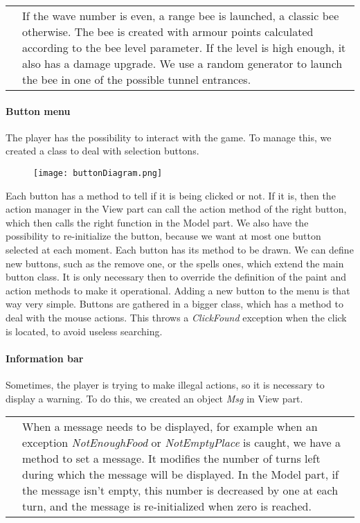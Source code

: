 \documentclass[
	a4paper
]{article}
\begin{document}
%
\begin{table}
	\begin{tabular}{c p{12cm}}
		\raisebox{-.5\height}{
			\texttt{[image: waveDiagram.png]} }
		& If the wave number is even, a range bee is launched, a classic bee otherwise. %
		The bee is created with armour points calculated according to the bee level parameter. %
		If the level is high enough, it also has a damage upgrade. We use a random generator to launch the bee in one of the possible tunnel entrances.\\
	\end{tabular}
\end{table}
%

\paragraph{Button menu} The player has the possibility to interact with the game. %
To manage this, we created a class to deal with selection buttons.

%
\begin{figure}[H]
	\texttt{[image: buttonDiagram.png]}
\end{figure}
%

Each button has a method to tell if it is being clicked or not. %
If it is, then the action manager in the View part can call the action method of the right button, which then calls the right function in the Model part. %
We also have the possibility to re-initialize the button, because we want at most one button selected at each moment. %
Each button has its method to be drawn. %
We can define new buttons, such as the remove one, or the spells ones, which extend the main button class. %
It is only necessary then to override the definition of the paint and action methods to make it operational. %
Adding a new button to the menu is that way very simple. %
Buttons are gathered in a bigger class, which has a method to deal with the mouse actions. %
This throws a \emph{ClickFound} exception when the click is located, to avoid useless searching.


\paragraph{Information bar} Sometimes, the player is trying to make illegal actions, so it is necessary to display a warning. %
To do this, we created an object \emph{Msg} in View part.

%
\begin{table}
	\begin{tabular}{c p{12cm}}
		\raisebox{-.5\height}{
			\texttt{[image: msgDiagram.png]} }
		& When a message needs to be displayed, for example when an exception \emph{NotEnoughFood} or \emph{NotEmptyPlace} is caught, we have a method to set a message. %
		It modifies the number of turns left during which the message will be displayed. %
		In the Model part, if the message isn't empty, this number is decreased by one at each turn, and the message is re-initialized when zero is reached.\\
	\end{tabular}
\end{table}
%
\end{document}
